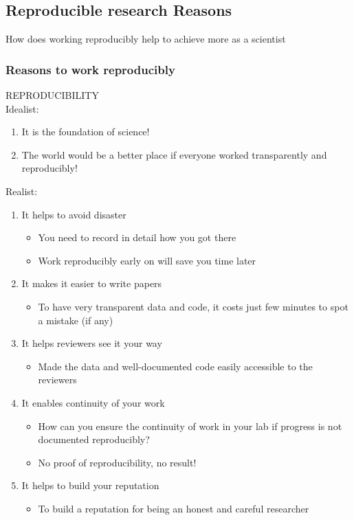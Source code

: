 \documentclass{beamer}
\begin{document}
\begin{frame}
\section{Reproducible research Reasons}
\vspace{50px}
\begin{flushright}
\scriptsize How does working reproducibly help to achieve more as a scientist \citep{Markowetz:2016cs}\\
\end{flushright}
\end{frame}

\begin{frame}
\frametitle{Reasons to work reproducibly}
\Large REPRODUCIBILITY \citep{Markowetz:2016cs}\\
Idealist:
\begin{enumerate}
\tiny
\item It is the foundation of science!
\item The world would be a better place if everyone worked transparently and reproducibly!
\end{enumerate}
Realist:
\begin{enumerate}
\footnotesize
\item It helps to avoid disaster
\begin{itemize}
\tiny
\item You need to record in detail how you got there
\item Work reproducibly early on will save you time later
\end{itemize}
\item It makes it easier to write papers
\begin{itemize}
\tiny
\item To have very transparent data and code, it costs just few minutes to spot a mistake (if any)
\end{itemize}
\item It helps reviewers see it your way
\begin{itemize}
\tiny
\item Made the data and well-documented code easily accessible to the reviewers
\end{itemize}
\item It enables continuity of your work
\begin{itemize}
\tiny
\item How can you ensure the continuity of work in your lab if progress is not documented reproducibly?
\item No proof of reproducibility, no result!
\end{itemize}
\item It helps to build your reputation
\begin{itemize}
\tiny
\item To build a reputation for being an honest and careful researcher
\end{itemize}

\end{enumerate}

\end{frame}
\end{document}
